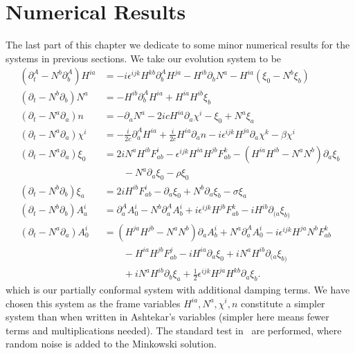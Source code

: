 \documentclass[10pt]{report}
\theoremstyle{definition}
\begin{document}
    \section{Numerical Results} \label{sec:pleb-num-numerical-results}

    The last part of this chapter we dedicate to some minor numerical results for the systems in previous sections. We take our evolution system to be 
    \begin{equation}
    \begin{aligned}
        (\partial^A_t - N^b \partial^A_b) H^{ia} &= -i \epsilon^{ijk} H^{kb} \partial^A_b H^{ja} - H^{ib} \partial_b N^a - H^{ia} (\xi_0 - N^b \xi_b) \nonumber\\
        (\partial_t - N^b \partial_b) N^a &= - H^{ib} \partial_b^A H^{ia} + H^{ia} H^{ib} \xi_b \nonumber\\
        (\partial_t - N^a \partial_a) n &= - \partial_a N^a - 2ic H^{ia} \partial_a \chi^i - \xi_0 + N^a \xi_a \nonumber\\
        (\partial_t - N^a \partial_a) \chi^i &= -\frac{i}{2 c} \partial^A_a H^{ia} + \frac{i}{2c} H^{ia} \partial_a n - i \epsilon^{ijk} H^{ja} \partial_a \chi^k - \beta \chi^i \nonumber\\[20pt]
        (\partial_t - N^a \partial_a) \xi_0 & = 2i N^a H^{ib} F^i_{ab} - \epsilon^{ijk} H^{ia} H^{jb} F^k_{ab} - (H^{ia} H^{ib} - N^a N^b) \partial_a \xi_b \nonumber\\ & \quad\quad  - N^a \partial_a \xi_0 - \rho \xi_0 \nonumber\\
        (\partial_t - N^b \partial_b) \xi_a & = 2i H^{ib} F^i_{ab} - \partial_a \xi_0 + N^b \partial_a \xi_b - \sigma \xi_a\nonumber\\
        (\partial_t - N^b \partial_b) A^i_a & = \partial^A_a A^i_0 - N^b \partial_a^A A^i_b + i \epsilon^{ijk} H^{jb} F^k_{ab} - i H^{ib} \partial_{(a} \xi_{b)} \nonumber\\
        (\partial_t - N^a \partial_a) A^i_0 & = (H^{ja} H^{jb} - N^a N^b) \partial_a A^i_b + N^a \partial^A_a A^i_0 - i \epsilon^{ijk} H^{ja} N^b F^k_{ab} \nonumber\\ & \quad\quad -H^{ia} H^{jb} F^j_{ab} - i H^{ia} \partial_a \xi_0 + i N^a H^{ib} \partial_{(a} \xi_{b)} \nonumber\\  & \quad\quad +i N^a H^{ib} \partial_b \xi_a + \frac{1}{2} \epsilon^{ijk} H^{ja} H^{kb} \partial_a \xi_b.
    \end{aligned} \label{eq:num-plebanski-partially-conformal-system}
    \end{equation}
    which is our partially conformal system with additional damping terms. We have chosen this system as the frame variables $H^{ia},N^a,\chi^i,n$ constitute a simpler system than when written in Ashtekar's variables (simpler here means fewer terms and multiplications needed). The standard test in~\cite{Apples_with_App_Daveri_2018} are performed, where random noise is added to the Minkowski solution.
\end{document}
